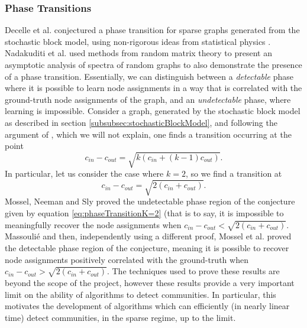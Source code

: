 \documentclass[12pt]{article}
\numberwithin{equation}{section}
\begin{document}
\subsubsection{Phase Transitions}
\label{subsubsec:phaseTransitions}

Decelle et al. \cite{DKM+11} conjectured a phase transition for sparse graphs generated from the stochastic block model, using non-rigorous ideas from statistical physics \cite{MNS12}. Nadakuditi et al. \cite{NN12} used methods from random matrix theory to present an asymptotic analysis of spectra of random graphs to also demonstrate the presence of a phase transition. Essentially, we can distinguish between a \textit{detectable} phase where it is possible to learn node assignments in a way that is correlated with the ground-truth node assignments of the graph, and an \textit{undetectable} phase, where learning is impossible. Consider a graph, generated by the stochastic block model as described in section \ref{subsubsec:stochasticBlockModel}, and following the argument of \cite{NN12}, which we will not explain, one finds a transition occurring at the point
\begin{equation}
\label{eq:phaseTransitionK}
	c_{in} - c_{out} = \sqrt{k(c_{in} + (k-1)c_{out})}.
\end{equation}
In particular, let us consider the case where $k = 2$, so we find a transition at
\begin{equation}
\label{eq:phaseTransitionK=2}
	c_{in} - c_{out} = \sqrt{2(c_{in} + c_{out})}.
\end{equation}
Mossel, Neeman and Sly \cite{MNS12} proved the undetectable phase region of the conjecture given by equation \eqref{eq:phaseTransitionK=2} (that is to say, it is impossible to meaningfully recover the node assignments when $ c_{in} - c_{out} < \sqrt{2(c_{in} + c_{out})}$. Massouli\'e \cite{Mas13} and then, independently using a different proof, Mossel et al. \cite{MNS13b} proved the detectable phase region of the conjecture, meaning it is possible to recover node assignments positively correlated with the ground-truth when $ c_{in} - c_{out} > \sqrt{2(c_{in} + c_{out})}$. The techniques used to prove these results are beyond the scope of the project, however these results provide a very important limit on the ability of algorithms to detect communities. In particular, this motivates the development of algorithms which can efficiently (in nearly linear time) detect communities, in the sparse regime, up to the limit.
\end{document}
